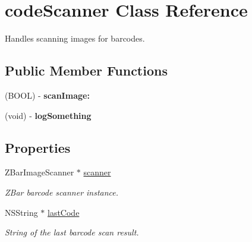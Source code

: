 \hypertarget{interfacecode_scanner}{
\section{codeScanner Class Reference}
\label{interfacecode_scanner}
}


Handles scanning images for barcodes.  


\subsection*{Public Member Functions}
\begin{DoxyCompactItemize}
\item 
\hypertarget{interfacecode_scanner_aa922540eabdce6de35fdd8eac84f2333}{
(BOOL) -\/ {\bfseries scanImage:}}
\label{interfacecode_scanner_aa922540eabdce6de35fdd8eac84f2333}

\item 
\hypertarget{interfacecode_scanner_ad3f2bb20f5b42071efcbdf0bcbc3b47d}{
(void) -\/ {\bfseries logSomething}}
\label{interfacecode_scanner_ad3f2bb20f5b42071efcbdf0bcbc3b47d}

\end{DoxyCompactItemize}
\subsection*{Properties}
\begin{DoxyCompactItemize}
\item 
\hypertarget{interfacecode_scanner_a65b46e21c00820ec14dd8621e79366b9}{
ZBarImageScanner $\ast$ \hyperlink{interfacecode_scanner_a65b46e21c00820ec14dd8621e79366b9}{scanner}}
\label{interfacecode_scanner_a65b46e21c00820ec14dd8621e79366b9}

\begin{DoxyCompactList}\small\item\em ZBar barcode scanner instance. \end{DoxyCompactList}\item 
\hypertarget{interfacecode_scanner_a93346aeb8d861a9c6c499367d19a3386}{
NSString $\ast$ \hyperlink{interfacecode_scanner_a93346aeb8d861a9c6c499367d19a3386}{lastCode}}
\label{interfacecode_scanner_a93346aeb8d861a9c6c499367d19a3386}

\begin{DoxyCompactList}\small\item\em String of the last barcode scan result. \end{DoxyCompactList}\end{DoxyCompactItemize}


